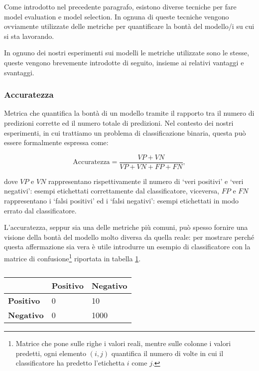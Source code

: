 \documentclass[../../main.tex]{subfiles}
\begin{document}
    Come introdotto nel precedente paragrafo, esistono diverse tecniche per fare model evaluation e model selection. In ognuna di queste tecniche vengono ovviamente utilizzate delle metriche per quantificare la bontà del modello/i su cui si sta lavorando.

    In ognuno dei nostri esperimenti sui modelli le metriche utilizzate sono le stesse, queste vengono brevemente introdotte di seguito, insieme ai relativi vantaggi e svantaggi.

    \subsubsection{Accuratezza}
    Metrica che quantifica la bontà di un modello tramite il rapporto tra il numero di predizioni corrette ed il numero totale di predizioni. Nel contesto dei nostri esperimenti, in cui trattiamo un problema di classificazione binaria, questa può essere formalmente espressa come: 

    \begin{equation}
        \mathrm{Accuratezza} = \frac{VP + VN}{VP + VN + FP + FN},
    \end{equation}

    dove $VP$ e $VN$ rappresentano rispettivamente il numero di `veri positivi' e `veri negativi': esempi etichettati correttamente dal classificatore, viceversa, $FP$ e $FN$ rappresentano i `falsi positivi' ed i `falsi negativi': esempi etichettati in modo errato dal classificatore.

    L'accuratezza, seppur sia una delle metriche più comuni, può spesso fornire una visione della bontà del modello molto diversa da quella reale: per mostrare perché questa affermazione sia vera è utile introdurre un esempio di classificatore con la matrice di confusione\footnote{Matrice che pone sulle righe i valori reali, mentre sulle colonne i valori predetti, ogni elemento $(i,j)$ quantifica il numero di volte in cui il classificatore ha predetto l'etichetta $i$ come $j$.} riportata in tabella \ref{tab:matriceConfusione}.

    \begin{table}[H]
        \centering
        \begin{tabular}{l|ll}
                            & \textbf{Positivo} & \textbf{Negativo} \\ \hline
        \textbf{Positivo} & 0                 & 10                 \\
        \textbf{Negativo} & 0                 & 1000             
        \end{tabular}
        \caption{}  
        \label{tab:matriceConfusione}    
    \end{table}
\end{document}
